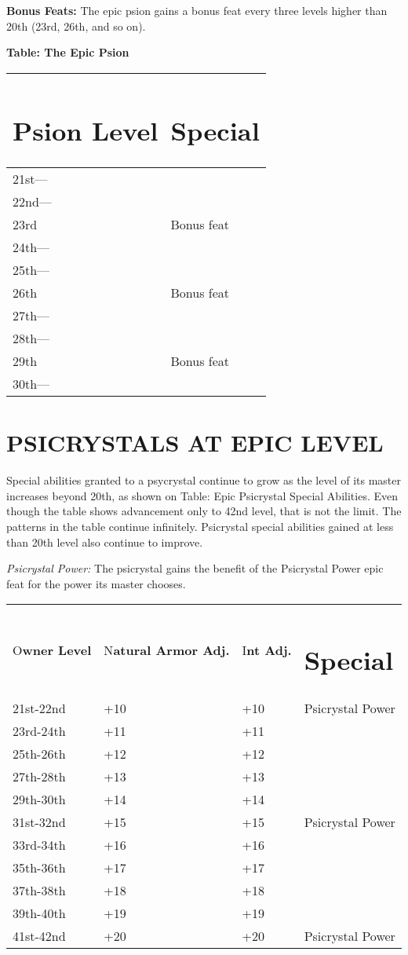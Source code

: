 \documentclass{article}
\begin{document}
\textbf{Bonus Feats:} The epic psion gains a bonus feat every three levels higher 
than 20th (23rd, 26th, and so on).

\textbf{Table: The Epic Psion }

\begin{tabular}{|>{\raggedright}p{38pt}|>{\raggedright}p{60pt}|}
\hline
\section*{P\textbf{sion Level}} & \section*{S\textbf{pecial }}\tabularnewline
\hline
21st--- &  \tabularnewline
\hline
22nd--- &  \tabularnewline
\hline
23rd & Bonus feat \tabularnewline
\hline
24th--- &  \tabularnewline
\hline
25th--- &  \tabularnewline
\hline
26th & Bonus feat \tabularnewline
\hline
27th--- &  \tabularnewline
\hline
28th--- &  \tabularnewline
\hline
29th & Bonus feat \tabularnewline
\hline
30th--- &  \tabularnewline
\hline
\end{tabular}

\vspace{12pt}
\section*{PSICRYSTALS AT EPIC LEVEL }

Special abilities granted to a psycrystal continue to grow as the level of its 
master increases beyond 20th, as shown on Table: Epic Psicrystal Special Abilities. 
Even though the table shows advancement only to 42nd level, that is not the limit. 
The patterns in the table continue infinitely. Psicrystal special abilities gained 
at less than 20th level also continue to improve. 

\textit{Psicrystal Power: }The psicrystal gains the benefit of the Psicrystal Power 
epic feat for the power its master chooses. 

\vspace{12pt}
\begin{tabular}{|>{\raggedright}p{47pt}|>{\raggedright}p{51pt}|>{\raggedright}p{33pt}|>{\raggedright}p{70pt}|}
\hline
\multicolumn{4}{|p{202pt}|}{T\textbf{able: Epic Psicrystal Special Abilities}}\tabularnewline
\hline
O\textbf{wner Level} & N\textbf{atural Armor Adj.} & I\textbf{nt Adj.} & \section*{S\textbf{pecial}}\tabularnewline
\hline
21st-22nd & +10 & +10 & Psicrystal Power\tabularnewline
\hline
23rd-24th & +11 & +11 & \tabularnewline
\hline
25th-26th & +12 & +12 & \tabularnewline
\hline
27th-28th & +13 & +13 & \tabularnewline
\hline
29th-30th & +14 & +14 & \tabularnewline
\hline
31st-32nd & +15 & +15 & Psicrystal Power\tabularnewline
\hline
33rd-34th & +16 & +16 & \tabularnewline
\hline
35th-36th & +17 & +17 & \tabularnewline
\hline
37th-38th & +18 & +18 & \tabularnewline
\hline
39th-40th & +19 & +19 & \tabularnewline
\hline
41st-42nd & +20 & +20 & Psicrystal Power\tabularnewline
\hline
\end{tabular}
\end{document}
